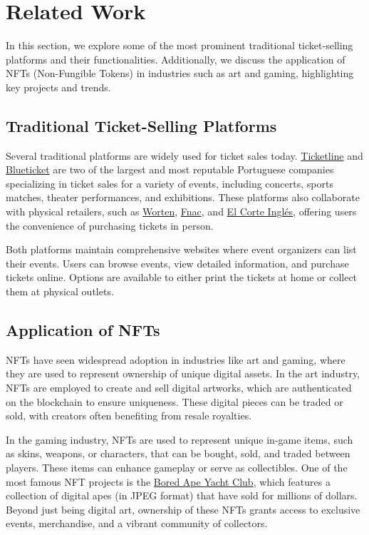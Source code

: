 \section{Related Work}
\label{sec:related_work}

In this section, we explore some of the most prominent traditional ticket-selling platforms and their functionalities. Additionally, we discuss the application of NFTs (Non-Fungible Tokens) in industries such as art and gaming, highlighting key projects and trends.

\subsection{Traditional Ticket-Selling Platforms}
\label{subsec:traditional_ticket_selling_platforms}

Several traditional platforms are widely used for ticket sales today. \href{https://ticketline.sapo.pt/}{Ticketline} and \href{https://blueticket.meo.pt/}{Blueticket} are two of the largest and most reputable Portuguese companies specializing in ticket sales for a variety of events, including concerts, sports matches, theater performances, and exhibitions. These platforms also collaborate with physical retailers, such as \href{https://www.worten.pt/}{Worten}, \href{https://www.fnac.pt/}{Fnac}, and \href{https://www.elcorteingles.pt/}{El Corte Inglés}, offering users the convenience of purchasing tickets in person.

Both platforms maintain comprehensive websites where event organizers can list their events. Users can browse events, view detailed information, and purchase tickets online. Options are available to either print the tickets at home or collect them at physical outlets.


\subsection{Application of NFTs}
\label{subsec:application_of_nfts}

NFTs have seen widespread adoption in industries like art and gaming, where they are used to represent ownership of unique digital assets. In the art industry, NFTs are employed to create and sell digital artworks, which are authenticated on the blockchain to ensure uniqueness. These digital pieces can be traded or sold, with creators often benefiting from resale royalties. 

In the gaming industry, NFTs are used to represent unique in-game items, such as skins, weapons, or characters, that can be bought, sold, and traded between players. These items can enhance gameplay or serve as collectibles. One of the most famous NFT projects is the \href{https://www.boredapeyachtclub.com/}{Bored Ape Yacht Club}, which features a collection of digital apes (in JPEG format) that have sold for millions of dollars. Beyond just being digital art, ownership of these NFTs grants access to exclusive events, merchandise, and a vibrant community of collectors.
